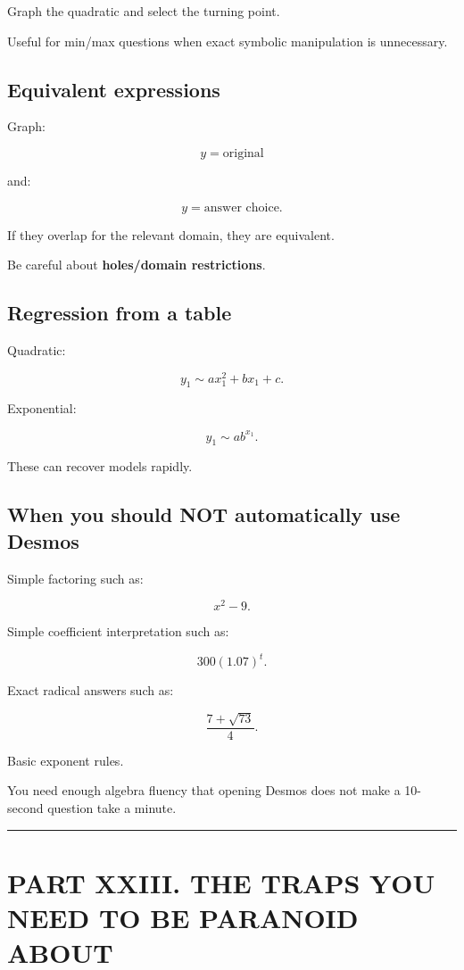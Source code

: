 \documentclass[
]{article}
\begin{document}
Graph the quadratic and select the turning point.

Useful for min/max questions when exact symbolic manipulation is
unnecessary.

\subsection{Equivalent expressions}\label{equivalent-expressions}

Graph:

\[
y=\text{original}
\]

and:

\[
y=\text{answer choice}.
\]

If they overlap for the relevant domain, they are equivalent.

Be careful about \textbf{holes/domain restrictions}.

\subsection{Regression from a table}\label{regression-from-a-table}

Quadratic:

\[
y_1\sim ax_1^2+bx_1+c.
\]

Exponential:

\[
y_1\sim ab^{x_1}.
\]

These can recover models rapidly.

\subsection{When you should NOT automatically use
Desmos}\label{when-you-should-not-automatically-use-desmos}

Simple factoring such as:

\[
x^2-9.
\]

Simple coefficient interpretation such as:

\[
300(1.07)^t.
\]

Exact radical answers such as:

\[
\frac{7+\sqrt{73}}4.
\]

Basic exponent rules.

You need enough algebra fluency that opening Desmos does not make a
10-second question take a minute.

\begin{center}\rule{0.5\linewidth}{0.5pt}\end{center}

\section{PART XXIII. THE TRAPS YOU NEED TO BE PARANOID
ABOUT}\label{part-xxiii.-the-traps-you-need-to-be-paranoid-about}
\end{document}
